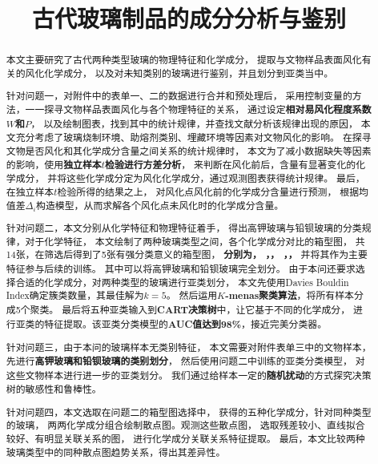 \documentclass[withoutpreface,bwprint]{cumcmthesis} %
\title{古代玻璃制品的成分分析与鉴别}
\begin{document}
\maketitle
\begin{abstract}

本文主要研究了古代两种类型玻璃的物理特征和化学成分，
提取与文物样品表面风化有关的风化化学成分，
以及对未知类别的玻璃进行鉴别，并且划分到亚类当中。

针对问题一，对附件中的表单一、二的数据进行合并和预处理后，
采用控制变量的方法，一一探寻文物样品表面风化与各个物理特征的关系，
通过设定\textbf{相对易风化程度系数$W$和$P$}，
以及绘制图表，找到其中的统计规律，并查找文献分析该规律出现的原因，
本文充分考虑了玻璃烧制环境、助熔剂类别、埋藏环境等因素对文物风化的影响。
在探寻文物是否风化和其化学成分含量之间关系的统计规律时，
本文为了减小数据缺失等因素的影响，使用\textbf{独立样本$t$检验进行方差分析}，
来判断在风化前后，含量有显著变化的化学成分，
并将这些化学成分定为风化化学成分，通过观测图表获得统计规律。
最后，在独立样本$t$检验所得的结果之上，
对风化点风化前的化学成分含量进行预测，
根据均值差$\Delta_i$构造模型，从而求解各个风化点未风化时的化学成分含量。

针对问题二，本文分别从化学特征和物理特征着手，
得出高钾玻璃与铅钡玻璃的分类规律，对于化学特征，
本文绘制了两种玻璃类型之间，各个化学成分对比的箱型图，
共14张，在筛选后得到了5张有强分类意义的箱型图，
\textbf{分别为， ，， ，，}
并将其作为主要特征参与后续的训练。
其中可以将高钾玻璃和铅钡玻璃完全划分。
由于本问还要求选择合适的化学成分，对两种类型的玻璃进行亚类划分，
本文先使用Davies Bouldin Index确定簇类数量，其最佳解为$k=5$。
然后运用\textbf{$K$-menas聚类算法}，将所有样本分成5个聚类。
最后将五种亚类输入到\textbf{CART决策树}中，让它基于不同的化学成分，
进行亚类的特征提取。该亚类分类模型的\textbf{AUC值达到98\%}，接近完美分类器。

针对问题三，由于本问的玻璃样本无类别特征，
本文需要对附件表单三中的文物样本，
先进行\textbf{高钾玻璃和铅钡玻璃的类别划分}，
然后使用问题二中训练的亚类分类模型，
对这些文物样本进行进一步的亚类划分。
我们通过给样本一定的\textbf{随机扰动}的方式探究决策树的敏感性和鲁棒性。

针对问题四，本文选取在问题二的箱型图选择中，
获得的五种化学成分，针对同种类型的玻璃，
两两化学成分组合绘制散点图。观测这些散点图，
选取残差较小、直线拟合较好、有明显关联关系的图，
进行化学成分关联关系特征提取。
最后，本文比较两种玻璃类型中的同种散点图趋势关系，得出其差异性。
\end{abstract}
\end{document}
